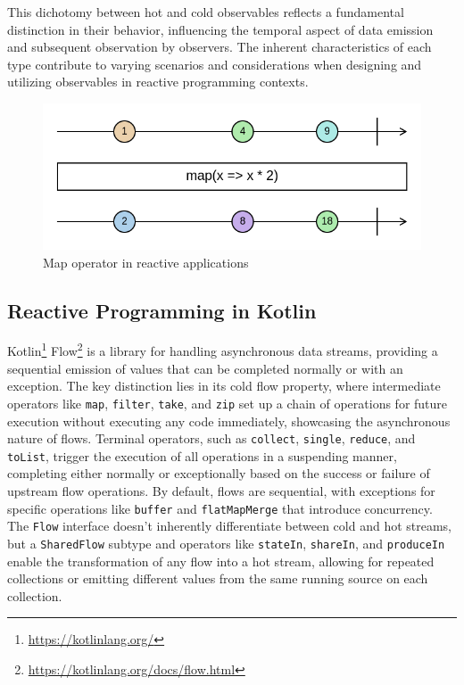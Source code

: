\documentclass[12pt,a4paper,openright,twoside]{book}
\begin{document}
This dichotomy between hot and cold observables reflects a fundamental distinction in their behavior, influencing the temporal aspect of data emission and subsequent observation by observers. The inherent characteristics of each type contribute to varying scenarios and considerations when designing and utilizing observables in reactive programming contexts.

\begin{figure}
    \centering
    \includegraphics[width=\linewidth]{figures/map-marble.png}
    \caption{Map operator in reactive applications}
    \label{fig:reactive-map}
\end{figure}

\subsection{Reactive Programming in Kotlin}

Kotlin\footnote{\url{https://kotlinlang.org/}} Flow\footnote{\url{https://kotlinlang.org/docs/flow.html}} is a library for handling asynchronous data streams, providing a sequential emission of values that can be completed normally or with an exception. The key distinction lies in its cold flow property, where intermediate operators like \texttt{map}, \texttt{filter}, \texttt{take}, and \texttt{zip} set up a chain of operations for future execution without executing any code immediately, showcasing the asynchronous nature of flows. Terminal operators, such as \texttt{collect}, \texttt{single}, \texttt{reduce}, and \texttt{toList}, trigger the execution of all operations in a suspending manner, completing either normally or exceptionally based on the success or failure of upstream flow operations. By default, flows are sequential, with exceptions for specific operations like \texttt{buffer} and \texttt{flatMapMerge} that introduce concurrency. The \texttt{Flow} interface doesn't inherently differentiate between cold and hot streams, but a \texttt{SharedFlow} subtype and operators like \texttt{stateIn}, \texttt{shareIn}, and \texttt{produceIn} enable the transformation of any flow into a hot stream, allowing for repeated collections or emitting different values from the same running source on each collection.
\end{document}
